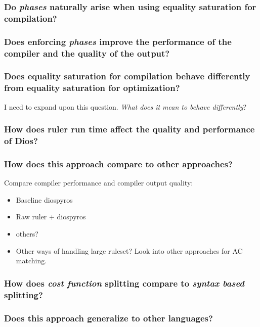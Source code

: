 \documentclass[11pt]{article}
\begin{document}
\subsubsection{Do \emph{phases} naturally arise when using equality saturation for compilation?}
\label{sec:org1ce1c2b}

\subsubsection{Does enforcing \emph{phases} improve the performance of the compiler and the quality of the output?}
\label{sec:org7cc4de3}

\subsubsection{Does equality saturation for compilation behave differently from equality saturation for optimization?}
\label{sec:orgc1bb5c8}

I need to expand upon this question. \emph{What does it mean to behave differently}?

\subsubsection{How does ruler run time affect the quality and performance of Dios?}
\label{sec:org6236146}

\subsubsection{How does this approach compare to other approaches?}
\label{sec:org1ba2132}

Compare compiler performance and compiler output quality:
\begin{itemize}
\item Baseline diospyros
\item Raw ruler + diospyros
\item others?
\item Other ways of handling large ruleset? Look into other approaches for AC matching.
\end{itemize}

\subsubsection{How does \emph{cost function} splitting compare to \emph{syntax based} splitting?}
\label{sec:orgbba82be}

\subsubsection{Does this approach generalize to other languages?}
\label{sec:orgcb8b619}
\end{document}
